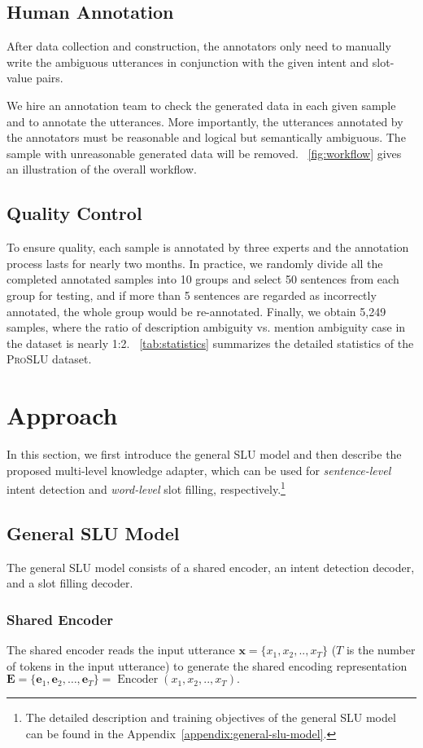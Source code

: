 \documentclass[letterpaper]{article} \usepackage{aaai22}  \usepackage{times}  \usepackage{helvet}  \usepackage{courier}  \usepackage[hyphens]{url}  \usepackage{graphicx} \urlstyle{rm} \def\UrlFont{\rm}  \usepackage{natbib}  \usepackage{caption} \DeclareCaptionStyle{ruled}{labelfont=normalfont,labelsep=colon,strut=off} \frenchspacing  \setlength{\pdfpagewidth}{8.5in}  \setlength{\pdfpageheight}{11in}  \usepackage{algorithm}
\begin{document}
\subsection{Human Annotation}

After data collection and construction, 
the annotators only need to manually write the ambiguous utterances in conjunction with the given intent and slot-value pairs. 

We hire an annotation team to check the generated data in each given sample and to annotate the utterances.
More importantly, the utterances annotated by the annotators must be reasonable and logical but semantically ambiguous.
The sample with unreasonable generated data will be removed. 
\figurename~\ref{fig:workflow} gives an illustration of the overall workflow.

\subsection{Quality Control}
To ensure quality, each sample is annotated by three experts and the annotation process lasts for nearly two months. 
In practice, we randomly divide all the completed annotated samples into 10 groups and select 50 sentences from each group for testing, and if more than 5 sentences are regarded as incorrectly annotated, the whole group would be re-annotated. 
Finally, we obtain 5,249 samples, where the ratio of description ambiguity vs. mention ambiguity case in the dataset is nearly 1:2. 
\tablename~\ref{tab:statistics} summarizes the detailed statistics of the \textsc{ProSLU} dataset. \section{Approach}
\label{Approach}
In this section, we first introduce the general SLU model and then describe the proposed multi-level knowledge adapter, which can be used for \textit{sentence-level} intent detection and \textit{word-level} slot filling, respectively.\footnote{The detailed description and training objectives of the general SLU model can be found in the Appendix~\ref{appendix:general-slu-model}.}

\subsection{General SLU Model} \label{sec:general_model}
The general SLU model consists of a shared encoder, an intent detection decoder, and a slot filling decoder.
\subsubsection{Shared Encoder}
The shared encoder reads the input utterance $\mathbf{x}=\{{x}_{1}, {x}_{2},.., {x}_{T}\}$ ($T$ is the number of tokens in the input utterance) to generate the shared encoding representation 
$\mathbf{E}=\{\mathbf{e}_{1}, \mathbf{e}_2, \dots, \mathbf{e}_{T}\}\!=\!\operatorname{Encoder}\left({x}_{1}, {x}_{2},.., {x}_{T}\right).$
\end{document}
